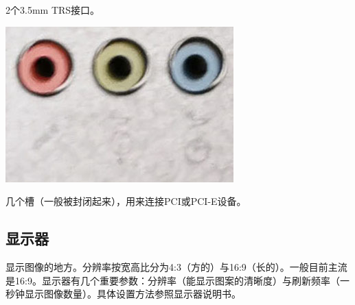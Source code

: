 2个3.5mm TRS接口。
\begin{center}
	\includegraphics[scale=0.3]{pic/TRS}
\end{center}\par
几个槽（一般被封闭起来），用来连接PCI或PCI-E设备。
\subsection{显示器}
显示图像的地方。分辨率按宽高比分为4:3（方的）与16:9（长的）。一般目前主流是16:9。显示器有几个重要参数：分辨率（能显示图案的清晰度）与刷新频率（一秒钟显示图像数量）。具体设置方法参照显示器说明书。
